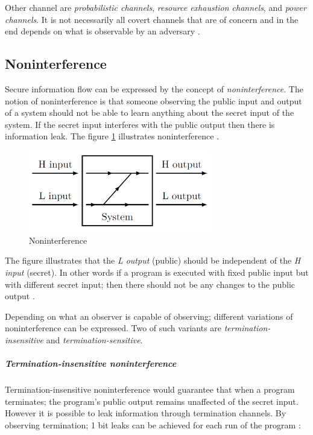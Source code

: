 Other channel are \emph{probabilistic channels}, \emph{resource exhaustion channels}, and \emph{power channels}. It is not necessarily all covert channels that are of concern and in the end depends on what is observable by an adversary \cite{Sabelfeld2003}.

\subsection{Noninterference}
Secure information flow can be expressed by the concept of \emph{noninterference}. The notion of noninterference is that someone observing the public input and output of a system should not be able to learn anything about the secret input of the system. If the secret input interferes with the public output then there is information leak. The figure \ref{fig:noninterference} illustrates noninterference \cite{Hedin2011}.  



\begin{figure}[H]
	\centering
	\includegraphics[width=8cm]{figures/noninterference2.png}
	\caption{ Noninterference \cite{Musard2014}}
	\label{fig:noninterference}
\end{figure}

The figure illustrates that the \emph{L output} (public) should be independent of the \emph{H input} (secret). In other words if a program is executed with fixed public input but with different secret input; then there should not be any changes to the public output \cite{Hedin2011}.


Depending on what an observer is capable of observing; different variations of noninterference can be expressed. Two of such variants are \emph{termination-insensitive} and \emph{termination-sensitive}.


\subparagraph{Termination-insensitive noninterference}

Termination-insensitive noninterference would guarantee that when a program terminates; the program's public output remains unaffected of the secret input. However it is possible to leak information through termination channels. By observing termination; 1 bit leaks can be achieved for each run of the program \cite{Hedin2011}:

